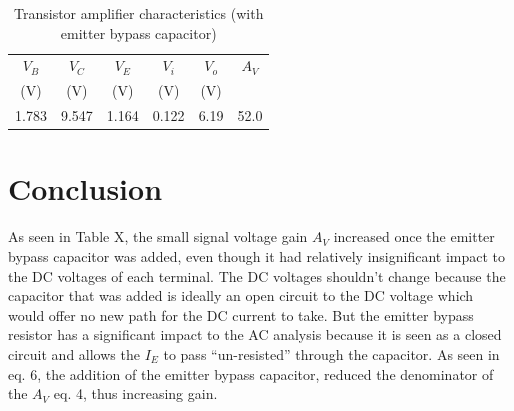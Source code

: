 \begin{table}[hbtp]
  \centering
  \begin{tabular}{ccc|cc|c}
    $V_B$    & $V_C$    & $V_E$    & $V_i$    & $V_o$    & $A_V$ \\
    (\si{V}) & (\si{V}) & (\si{V}) & (\si{V}) & (\si{V}) &       \\
    \hline
    1.783    & 9.547    & 1.164    & 0.122    & 6.19     & 52.0
  \end{tabular}
  \caption{\label{tab:amp_bypass} Transistor amplifier characteristics (with emitter bypass capacitor)}
\end{table}


\section{Conclusion}
\label{sec:conclusion}

As seen in Table X, the small signal voltage gain $A_V$ increased once the emitter bypass capacitor was added, even though it had relatively insignificant impact to the DC voltages of each terminal. The DC voltages shouldn’t change because the capacitor that was added is ideally an open circuit to the DC voltage which would offer no new path for the DC current to take. But the emitter bypass resistor has a significant impact to the AC analysis because it is seen as a closed circuit and allows the $I_E$ to pass “un-resisted” through the capacitor. As seen in eq. 6, the addition of the emitter bypass capacitor, reduced the denominator of the $A_V$ eq. 4, thus increasing gain.


